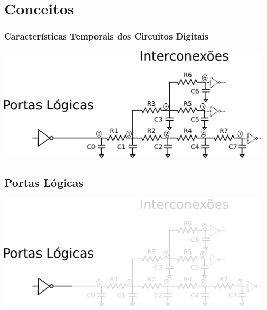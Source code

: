 \documentclass[10pt,a4paper]{beamer}
\begin{document}
	
	\section{Conceitos}
		
		\begin{frame}
		\frametitle{Características Temporais dos Circuitos Digitais}
			\includegraphics[width=\textwidth]{img/circuito.pdf} 
		\end{frame}

		\subsection*{Portas Lógicas}
			\begin{frame}
				\begin{center}
					\includegraphics[width=\textwidth]{img/circuito_portas.pdf} 
				\end{center}
			\end{frame}
			
\end{document}
